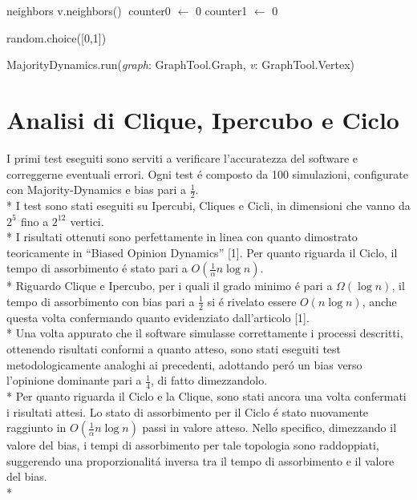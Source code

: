 \documentclass[../Tesi.tex]{subfiles}
\begin{document}
\begin{algorithm}[H]
  neighbors \gets v.neighbors()$\;$
  counter0 $\gets$ 0\;
  counter1 $\gets$ 0\;
  
  
  \Return random.choice([0,1])$\;$
\caption{MajorityDynamics.run(\emph{graph}: GraphTool.Graph, \emph{v}: GraphTool.Vertex)}
\end{algorithm}

\section{Analisi di Clique, Ipercubo e Ciclo}
I primi test eseguiti sono serviti a verificare l'accuratezza del software e correggerne eventuali errori. Ogni test \'e composto da 100 simulazioni, configurate con Majority-Dynamics e bias pari a $\frac{1}{2}$.\\*
I test sono stati eseguiti su Ipercubi, Cliques e Cicli, in dimensioni che vanno da $2^{5^{\mathrm{}}}$ fino a $2^{12^{\mathrm{}}}$ vertici.\\*
I risultati ottenuti sono perfettamente in linea con quanto dimostrato teoricamente in  ``Biased Opinion Dynamics'' [1]. Per quanto riguarda il Ciclo, il tempo di assorbimento \'e stato pari a $O(\frac{1}{\alpha}n\log{}n)$. \\*
Riguardo Clique e Ipercubo, per i quali il grado minimo \'e pari a $\Omega(\log{}n)$, il tempo di assorbimento con bias pari a $\frac{1}{2}$ si \'e rivelato essere $O(n\log{}n)$, anche questa volta confermando quanto evidenziato dall'articolo [1].\\*
Una volta appurato che il software simulasse correttamente i processi descritti, ottenendo risultati conformi a quanto atteso, sono stati eseguiti test metodologicamente analoghi ai precedenti, adottando per\'o un bias verso l'opinione dominante pari a $\frac{1}{4}$, di fatto dimezzandolo.\\*
Per quanto riguarda il Ciclo e la Clique, sono stati ancora una volta confermati i risultati attesi.
Lo stato di assorbimento per il Ciclo \'e stato nuovamente raggiunto in $O(\frac{1}{\alpha}n\log{}n)$ passi in valore atteso. Nello specifico, dimezzando il valore del bias, i tempi di assorbimento per tale topologia sono raddoppiati, suggerendo una proporzionalit\'a inversa tra il tempo di assorbimento e il valore del bias.\\*
\end{document}
